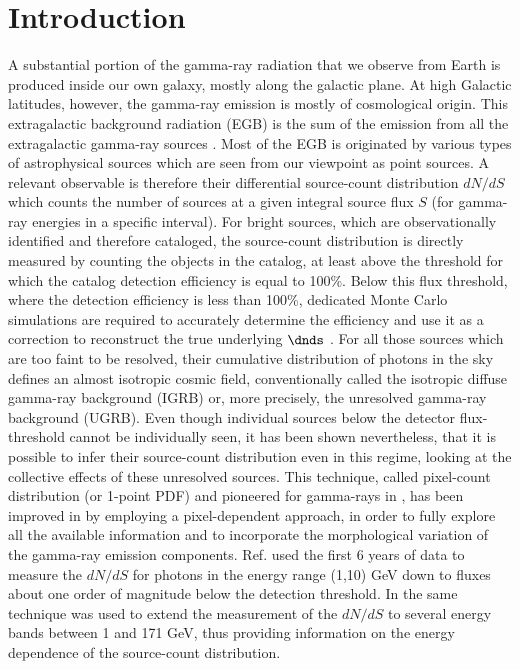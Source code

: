 \section{Introduction}

A substantial portion of the gamma-ray radiation that we observe from Earth is produced inside our own galaxy, mostly along the galactic plane. At high Galactic latitudes, however, the gamma-ray emission is mostly of cosmological origin.
This extragalactic background radiation (EGB) is the sum of the emission from all the extragalactic gamma-ray sources \cite{fornasa:2015,Ackermann_2015}. Most of the EGB is originated by various types of astrophysical sources which are seen from our viewpoint as point sources. A relevant observable is therefore their differential source-count distribution $dN/dS$ which counts the number of sources at a given integral source ﬂux $S$ (for gamma-ray energies in a specific interval). For bright sources, which are observationally identified and therefore cataloged, the source-count distribution is directly measured by counting the objects in the catalog,
at least above the threshold for which the catalog detection efficiency is equal to 100\%.  
Below this flux threshold, where the detection efficiency is less than 100\%, dedicated Monte Carlo simulations are required to accurately determine the efficiency and use it as a correction to reconstruct the true underlying $\dnds$ \cite{Fermi-LAT:2010tsy,Fermi-LAT:2015otn,Ajello:2015mfa,Marcotulli:2020fpm}.
For all those sources which are too faint to be resolved, their cumulative distribution of photons in the sky defines an almost isotropic cosmic field, conventionally called the isotropic diffuse gamma-ray background (IGRB) or, more precisely, the unresolved gamma-ray background (UGRB). Even though individual sources below the detector flux-threshold cannot be individually seen, it has been shown \cite{Malyshev_2011, Cuoco-1pdf,Zechlin:2016pme,Lisanti:2016jub}  nevertheless, that it is possible to infer their source-count distribution even in this regime, looking at the collective effects of these unresolved sources. This technique, called pixel-count distribution (or 1-point PDF) and pioneered for gamma-rays in \cite{Malyshev_2011}, has been improved in \cite{Cuoco-1pdf,Zechlin:2016pme,Lisanti:2016jub} by employing a pixel-dependent approach, in order to fully explore all the available information and to incorporate the morphological variation of the gamma-ray emission components. Ref. \cite{Cuoco-1pdf} used the first 6 years of \fermi \cite{Fermi-LAT:2009ihh} data to measure the $dN/dS$ for photons in the energy range (1,10) GeV down to fluxes about one order of magnitude below the \fermi detection threshold. In \cite{Zechlin:2016pme,Lisanti:2016jub} the same technique was used to extend the measurement of the $dN/dS$ to several energy bands between 1 and 171 GeV, thus providing information on the energy dependence of the source-count distribution.
